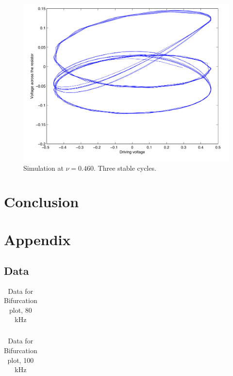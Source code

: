 \documentclass[12pt]{report}
\begin{document}
	\begin{figure}
		\centering
		\includegraphics{simulations/plotnu0460.png}
		\caption{Simulation at $\nu=0.460$. Three stable cycles.}
		\label{fig:sim.0460}
	\end{figure}




	\chapter{Conclusion}


\chapter{Appendix}

\section{Data}
\label{sec:Data}

	\begin{table}[h]
		\centering
		\begin{tabular}{|l|l|l||l|l|l|}
			\hline
			 
		\end{tabular}
		\caption{Data for Bifurcation plot, 80 kHz}
		\label{tab:80khz}
	\end{table}

	\begin{table}[h]
		\centering
		\begin{tabular}{|l|l|l|l||l|l|l|l|}
			\hline
			 
		\end{tabular}
		\caption{Data for Bifurcation plot, 100 kHz}
		\label{tab:100khz}
	\end{table}
\end{document}
